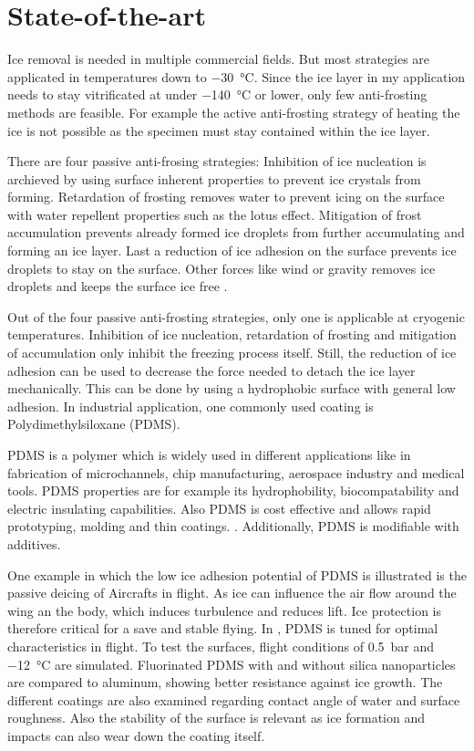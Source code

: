 \section{State-of-the-art}

Ice removal is needed in multiple commercial fields. But most strategies are applicated in temperatures down to \SI{-30}{\degreeCelsius}. Since the ice layer in my application needs to stay vitrificated at under \SI{-140}{\degreeCelsius} or lower, only few anti-frosting methods are feasible. For example the active anti-frosting strategy of heating the ice is not possible as the specimen must stay contained within the ice layer.

There are four passive anti-frosing strategies: Inhibition of ice nucleation is archieved by using surface inherent properties to prevent ice crystals from forming. Retardation of frosting removes water to prevent icing on the surface with water repellent properties such as the lotus effect. Mitigation of frost accumulation prevents already formed ice droplets from further accumulating and forming an ice layer. Last a reduction of ice adhesion on the surface prevents ice droplets to stay on the surface. Other forces like wind or gravity removes ice droplets and keeps the surface ice free \cite{Yang.2021}. 

Out of the four passive anti-frosting strategies, only one is applicable at cryogenic temperatures. Inhibition of ice nucleation, retardation of frosting and mitigation of accumulation only inhibit the freezing process itself. Still, the reduction of ice adhesion can be used to decrease the force needed to detach the ice layer mechanically. This can be done by using a hydrophobic surface with general low adhesion. In industrial application, one commonly used coating is Polydimethylsiloxane (PDMS).

PDMS is a polymer which is widely used in different applications like in fabrication of microchannels, chip manufacturing, aerospace industry and medical tools. PDMS properties are for example its hydrophobility, biocompatability and electric insulating capabilities. Also PDMS is cost effective and allows rapid prototyping, molding and thin coatings. \cite{Wolf.2018}. Additionally, PDMS is modifiable with additives.

One example in which the low ice adhesion potential of PDMS is illustrated is the passive deicing of Aircrafts in flight. As ice can influence the air flow around the wing an the body, which induces turbulence and reduces lift. Ice protection is therefore critical for a save and stable flying. In \cite{Liu.2018}, PDMS is tuned for optimal characteristics in flight. To test the surfaces, flight conditions of \SI{0.5}{\bar} and \SI{-12}{\degreeCelsius} are simulated. Fluorinated PDMS with and without silica nanoparticles are compared to aluminum, showing better resistance against ice growth. The different coatings are also examined regarding contact angle of water and surface roughness. Also the stability of the surface is relevant as ice formation and impacts can also wear down the coating itself. 

